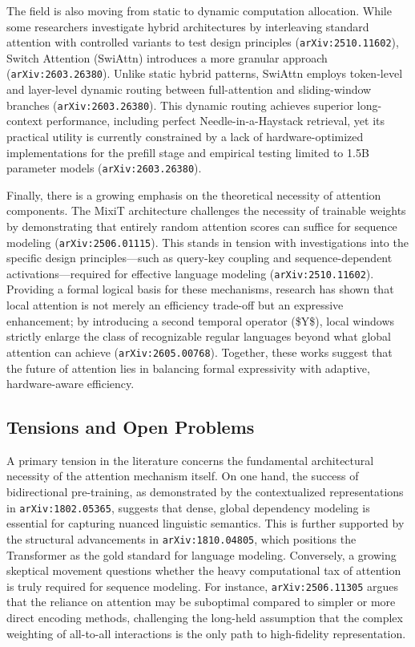 \documentclass[11pt]{article}
\begin{document}
The field is also moving from static to dynamic computation allocation. While some researchers investigate hybrid architectures by interleaving standard attention with controlled variants to test design principles (\texttt{arXiv:2510.11602}), Switch Attention (SwiAttn) introduces a more granular approach (\texttt{arXiv:2603.26380}). Unlike static hybrid patterns, SwiAttn employs token-level and layer-level dynamic routing between full-attention and sliding-window branches (\texttt{arXiv:2603.26380}). This dynamic routing achieves superior long-context performance, including perfect Needle-in-a-Haystack retrieval, yet its practical utility is currently constrained by a lack of hardware-optimized implementations for the prefill stage and empirical testing limited to 1.5B parameter models (\texttt{arXiv:2603.26380}).

Finally, there is a growing emphasis on the theoretical necessity of attention components. The MixiT architecture challenges the necessity of trainable weights by demonstrating that entirely random attention scores can suffice for sequence modeling (\texttt{arXiv:2506.01115}). This stands in tension with investigations into the specific design principles—such as query-key coupling and sequence-dependent activations—required for effective language modeling (\texttt{arXiv:2510.11602}). Providing a formal logical basis for these mechanisms, research has shown that local attention is not merely an efficiency trade-off but an expressive enhancement; by introducing a second temporal operator (\$Y\$), local windows strictly enlarge the class of recognizable regular languages beyond what global attention can achieve (\texttt{arXiv:2605.00768}). Together, these works suggest that the future of attention lies in balancing formal expressivity with adaptive, hardware-aware efficiency.

\subsection{Tensions and Open Problems}

A primary tension in the literature concerns the fundamental architectural necessity of the attention mechanism itself. On one hand, the success of bidirectional pre-training, as demonstrated by the contextualized representations in \texttt{arXiv:1802.05365}, suggests that dense, global dependency modeling is essential for capturing nuanced linguistic semantics. This is further supported by the structural advancements in \texttt{arXiv:1810.04805}, which positions the Transformer as the gold standard for language modeling. Conversely, a growing skeptical movement questions whether the heavy computational tax of attention is truly required for sequence modeling. For instance, \texttt{arXiv:2506.11305} argues that the reliance on attention may be suboptimal compared to simpler or more direct encoding methods, challenging the long-held assumption that the complex weighting of all-to-all interactions is the only path to high-fidelity representation.
\end{document}

